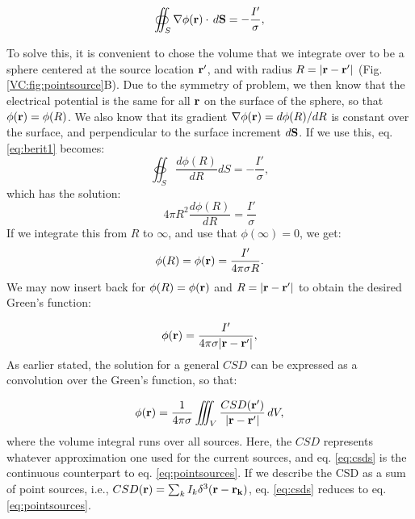 \begin{equation}
\oiint_{S} \nabla\phi({\bf r}) \cdot \, d{\bf S}  = - \frac{I'}{\sigma},
\label{eq:berit1}
\end{equation}

To solve this, it is convenient to chose the volume that we integrate over to be a sphere centered at the source location ${\bf r'}$, and with radius $R = |{\bf r-r'}|$ (Fig. \ref{VC:fig:pointsource}B). Due to the symmetry of problem, we then know that the electrical potential is the same for all ${\bf r}$ on the surface of the sphere, so that $\phi({\bf r}) = \phi(R)$. We also know that its gradient $\nabla\phi({\bf r}) = d\phi(R)/dR$ is constant over the surface, and perpendicular to the surface increment $d{\bf S}$. If we use this, eq. \ref{eq:berit1} becomes:
\begin{equation}
\oiint_{S} \frac{d\phi(R)}{dR} d{S}  = - \frac{I'}{\sigma},
\label{eq:berit1ogenhalv}
\end{equation}
which has the solution:
\begin{equation}
4\pi R^2 \frac{d\phi(R)}{dR} = \frac{I'}{\sigma}
\label{eq:berit2}
\end{equation}
If we integrate this from $R$ to $\infty$, and use that $\phi(\infty) = 0$, we get:
\begin{equation}
\phi(R) = \phi({\bf r}) = \frac{I'}{4\pi \sigma R}.
\label{eq:berit3}
\end{equation}
We may now insert back for $\phi(R)= \phi({\bf r})$ and $R = |{\bf r-r'}|$ to obtain the desired Green's function:

\begin{equation}
\phi({\bf r})= \frac{I'}{4\pi \sigma |{\bf r-r'}|},
\label{eq:berit4}
\end{equation}
As earlier stated, the solution for a general $CSD$ can be expressed as a convolution over the Green's function, so that:

\begin{equation}
\phi({\bf r}) = \frac{1}{4\pi \sigma}\iiint_V \frac{CSD({\bf r'})}{|{\bf r}-{\bf r'}|} \,dV, 
\label{eq:csds}
\end{equation}
where the volume integral runs over all sources. Here, the $CSD$ represents whatever approximation one used for the current sources, and eq. \ref{eq:csds} is the continuous counterpart to eq. \ref{eq:pointsources}. If we describe the CSD as a sum of point sources, i.e.,  $CSD({\bf r}) = \sum_k I_k \delta^3({\bf r} - {\bf r_k})$, eq. \ref{eq:csds} reduces to eq.\ref{eq:pointsources}.



